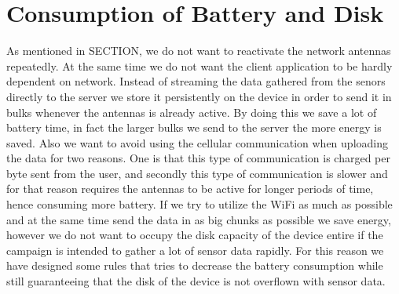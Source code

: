 \section{Consumption of Battery and Disk}

As mentioned in SECTION, we do not want to reactivate the network antennas repeatedly. At the same time we do not want the client application to be hardly dependent on network. Instead of streaming the data gathered from the senors directly to the server we store it persistently on the device in order to send it in bulks whenever the antennas is already active. By doing this we save a lot of battery time, in fact the larger bulks we send to the server the more energy is saved. Also we want to avoid using the cellular communication when uploading the data for two reasons. One is that this type of communication is charged per byte sent from the user, and secondly this type of communication is slower and for that reason requires the antennas to be active for longer periods of time, hence consuming more battery. If we try to utilize the WiFi as much as possible and at the same time send the data in as big chunks as possible we save energy, however we do not want to occupy the disk capacity of the device entire if the campaign is intended to gather a lot of sensor data rapidly. For this reason we have designed some rules that tries to decrease the battery consumption while still guaranteeing that the disk of the device is not overflown with sensor data.

